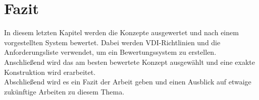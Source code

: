 \chapter{Fazit}\label{ch:conclusion}
In diesem letzten Kapitel werden die Konzepte ausgewertet und nach einem vorgestellten System bewertet. Dabei werden VDI-Richtlinien und die Anforderungsliste verwendet, um ein Bewertungssystem zu erstellen. Anschlie{\ss}end wird das am besten bewertete Konzept ausgew\"{a}hlt und eine exakte Konstruktion wird erarbeitet.\\
Abschlie{\ss}end wird es ein Fazit der Arbeit geben und einen Ausblick auf etwaige zuk\"{u}nftige Arbeiten zu diesem Thema.






